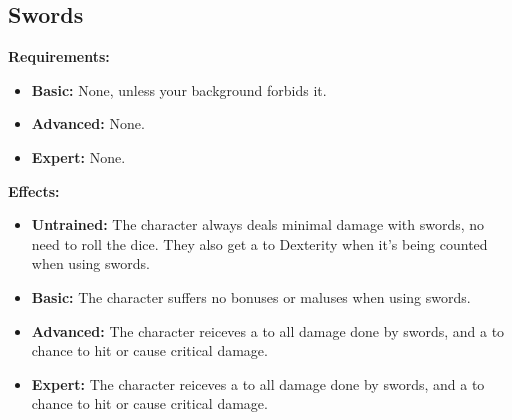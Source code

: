 \documentclass[openany,10pt,a4paper]{book}
\begin{document}
\subsection{Swords}
\begin{table}[!ht]
\centering
{}
\end{table}
\textbf{Requirements:}
\begin{itemize}
	\item \textbf{Basic:} None, unless your background forbids it.
	\item \textbf{Advanced:} None.
	\item \textbf{Expert:} None.
\end{itemize}
\textbf{Effects:}
\begin{itemize}
	\item \textbf{Untrained:} The character always deals minimal damage with swords, no need to roll the dice. They also get a  to Dexterity when it's being counted when using swords.
	\item \textbf{Basic:} The character suffers no bonuses or maluses when using swords.
	\item \textbf{Advanced:} The character reiceves a  to all damage done by swords, and a  to chance to hit or cause critical damage.
	\item \textbf{Expert:} The character reiceves a  to all damage done by swords, and a  to chance to hit or cause critical damage.
\end{itemize}\newpage
\end{document}
